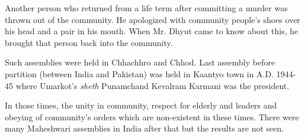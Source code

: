 Another person who returned from a life term after committing a murder was
thrown out of the community. He apologized with community people's shoes over
his head and a pair in his mouth. When Mr. Dhyut came to know about this, he
brought that person back into the community.

Such assemblies were held in Chhachhro and Chhod. Last assembly before
partition (between India and Pakistan) was held in Kaantyo town in A.D. 1944-45
where Umarkot's \textit{sheth} Punamchand Kevalram Karmani was the president.

In those times, the unity in community, respect for elderly and leaders and
obeying of community's orders which are non-existent in these times. There were
many Maheshwari assemblies in India after that but the results are not seen.
